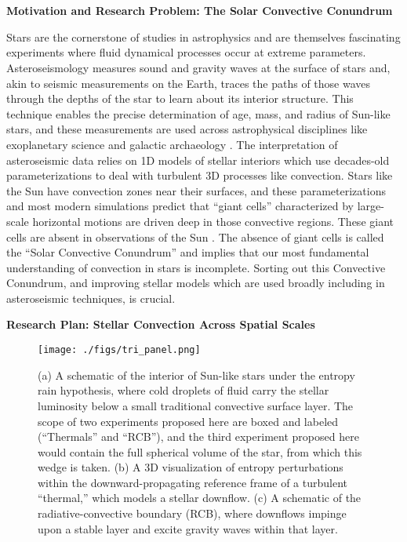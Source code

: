 \documentclass[onecolumn, 11pt, hmargin=1in, vmargin=1in]{aastex62}
\begin{document}
\section*{}
\thispagestyle{fancy}

\begin{center}
\vspace{-1.4in}
\textbf{Motivation and Research Problem: The Solar Convective Conundrum}
\vspace{-6pt}
\end{center}

Stars are the cornerstone of studies in astrophysics and are themselves fascinating experiments where fluid dynamical processes occur at extreme parameters.
Asteroseismology measures sound and gravity waves at the surface of stars and, akin to seismic measurements on the Earth, traces the paths of those waves through the depths of the star to learn about its interior structure.
This technique enables the precise determination of age, mass, and radius of Sun-like stars, and these measurements are used across astrophysical disciplines like exoplanetary science and galactic archaeology \citep{huber&all2019}.
The interpretation of asteroseismic data relies on 1D models of stellar interiors which use decades-old parameterizations \citep{bohm-vitense1958} to deal with turbulent 3D processes like convection.
Stars like the Sun have convection zones near their surfaces, and these parameterizations and most modern simulations predict that ``giant cells'' characterized by large-scale horizontal motions are driven deep in those convective regions.
These giant cells are absent in observations of the Sun \citep{hanasoge&all2015}.
The absence of giant cells is called the ``Solar Convective Conundrum'' and implies that our most fundamental understanding of convection in stars is incomplete.
Sorting out this Convective Conundrum, and improving stellar models which are used broadly including in asteroseismic techniques, is crucial.



\begin{center}
\vspace{-5pt}
\textbf{Research Plan: Stellar Convection Across Spatial Scales}
\vspace{-6pt}
\end{center}
\begin{figure*}[b]
    \texttt{[image: ./figs/tri\_panel.png]}
    \caption{ (a) A schematic of the interior of Sun-like stars under the entropy rain hypothesis, where cold droplets of fluid carry the stellar luminosity below a small traditional convective surface layer.
	The scope of two experiments proposed here are boxed and labeled (``Thermals'' and ``RCB''), and the third experiment proposed here would contain the full spherical volume of the star, from which this wedge is taken.
	(b) A 3D visualization of entropy perturbations within the downward-propagating reference frame of a turbulent ``thermal,'' which models a stellar downflow.
	(c) A schematic of the radiative-convective boundary (RCB), where downflows impinge upon a stable layer and excite gravity waves within that layer.
	\label{fig:tri_panel} }
\end{figure*}
\end{document}
